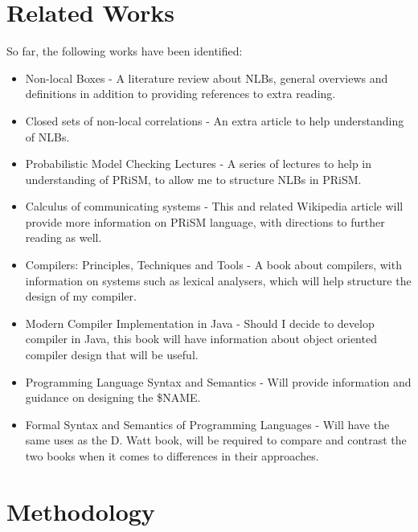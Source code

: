 \documentclass[11pt, a4paper]{article}
\begin{document}

\section{Related Works} %
\label{sec:related_works}
So far, the following works have been identified:
\begin{itemize}
    \item Non-local Boxes \parencite{nlb_lamontague} - A literature review about
    NLBs, general overviews and definitions in addition to providing references
    to extra reading.
    \item Closed sets of non-local correlations
    \parencite{Jonathan-Allcock:2009pd} - An extra article to help understanding
    of NLBs.
    \item Probabilistic Model Checking Lectures \parencite{prism_lectures} - A
    series of lectures to help in understanding of PRiSM, to allow me to
    structure NLBs in PRiSM.
    \item Calculus of communicating systems \parencite{ccs} - This and related
    Wikipedia article will provide more information on PRiSM language, with
    directions to further reading as well. 
    \item Compilers: Principles, Techniques and Tools
    \parencite{dragon_compiler} - A book about compilers, with information on
    systems such as lexical analysers, which will help structure the design of
    my compiler.
    \item Modern Compiler Implementation in Java \parencite{java_compiler} -
    Should I decide to develop compiler in Java, this book will have information
    about object oriented compiler design that will be useful.
    \item Programming Language Syntax and Semantics \parencite{plss} - Will
    provide information and guidance on designing the \$NAME.
    \item Formal Syntax and Semantics of Programming Languages \parencite{fsspl}
    - Will have the same uses as the D. Watt book, will be required to compare
    and contrast the two books when it comes to differences in their approaches.
\end{itemize}


\section{Methodology} %
\label{sec:methodology}
\end{document}
